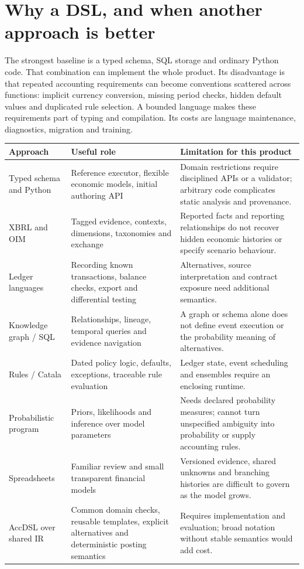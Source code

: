 \section{Why a DSL, and when another approach is better}

The strongest baseline is a typed schema, SQL storage and ordinary Python
code. That combination can implement the whole product. Its disadvantage is
that repeated accounting requirements can become conventions scattered across
functions: implicit currency conversion, missing period checks, hidden default
values and duplicated rule selection. A bounded language makes these
requirements part of typing and compilation. Its costs are language
maintenance, diagnostics, migration and training.

\begin{longtable}{L{29mm}L{51mm}L{56mm}}
\toprule Approach & Useful role & Limitation for this product\\\midrule\endhead
Typed schema and Python & Reference executor, flexible economic models,
initial authoring API & Domain restrictions require disciplined APIs or a
validator; arbitrary code complicates static analysis and provenance.\\
XBRL and OIM & Tagged evidence, contexts, dimensions, taxonomies and exchange &
Reported facts and reporting relationships do not recover hidden economic
histories or specify scenario behaviour.\\
Ledger languages & Recording known transactions, balance checks, export and
differential testing & Alternatives, source interpretation and contract
exposure need additional semantics.\\
Knowledge graph / SQL & Relationships, lineage, temporal queries and evidence
navigation & A graph or schema alone does not define event execution or the
probability meaning of alternatives.\\
Rules / Catala & Dated policy logic, defaults, exceptions, traceable rule
evaluation & Ledger state, event scheduling and ensembles require an enclosing
runtime.\\
Probabilistic program & Priors, likelihoods and inference over model parameters &
Needs declared probability measures; cannot turn unspecified ambiguity into
probability or supply accounting rules.\\
Spreadsheets & Familiar review and small transparent financial models &
Versioned evidence, shared unknowns and branching histories are difficult to
govern as the model grows.\\
AccDSL over shared IR & Common domain checks, reusable templates, explicit
alternatives and deterministic posting semantics & Requires implementation and
evaluation; broad notation without stable semantics would add cost.\\
\bottomrule
\end{longtable}

